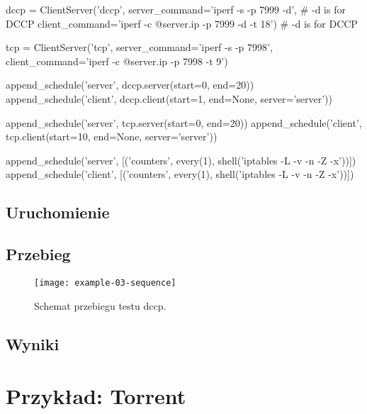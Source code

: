 \documentclass[00-praca-magisterska.tex]{subfiles}
\begin{document}
\begin{pythoncode}
  dccp = ClientServer('dccp',
      server_command='iperf -s -p 7999 -d', # -d is for DCCP
      client_command='iperf -c @{server.ip} -p 7999 -d -t 18') # -d is for DCCP

  tcp = ClientServer('tcp',
      server_command='iperf -s -p 7998',
      client_command='iperf -c @{server.ip} -p 7998 -t 9')
\end{pythoncode}

\begin{pythoncode}
  append_schedule('server', dccp.server(start=0, end=20))
  append_schedule('client', dccp.client(start=1, end=None, server='server'))

  append_schedule('server', tcp.server(start=0, end=20))
  append_schedule('client', tcp.client(start=10, end=None, server='server'))

  append_schedule('server', [('counters', every(1), shell('iptables -L -v -n -Z -x'))])
  append_schedule('client', [('counters', every(1), shell('iptables -L -v -n -Z -x'))])
\end{pythoncode}

\subsection{Uruchomienie}


\subsection{Przebieg}


\begin{figure}[htb]
\begin{center}
\leavevmode
\texttt{[image: example-03-sequence]}
\end{center}
\caption{Schemat przebiegu testu dccp.}
\label{fig:example-03-sequence}
\end{figure}

\subsection{Wyniki}


\section{Przykład: Torrent}
\end{document}
